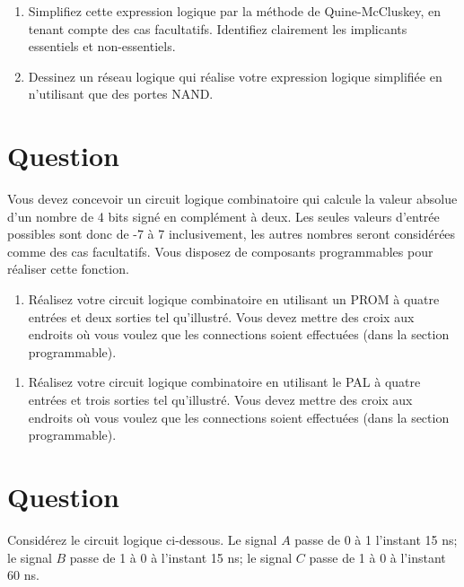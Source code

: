 \documentclass[letter, oneside]{book}
\begin{document}
\begin{enumerate}
\item Simplifiez cette expression logique par la méthode de
Quine-McCluskey, en tenant compte des cas facultatifs. Identifiez
clairement les implicants essentiels et non-essentiels.

\item Dessinez un réseau logique qui réalise votre expression logique
simplifiée en n'utilisant que des portes NAND.
\end{enumerate}

\section*{Question}
\label{sec:orgff5f2a7}
Vous devez concevoir un circuit logique combinatoire qui calcule la
valeur absolue d'un nombre de 4 bits signé en complément à deux. Les
seules valeurs d'entrée possibles sont donc de -7 à 7 inclusivement,
les autres nombres seront considérées comme des cas facultatifs. Vous
disposez de composants programmables pour réaliser cette fonction.

\begin{enumerate}
\item Réalisez votre circuit logique combinatoire en utilisant un PROM à
quatre entrées et deux sorties tel qu'illustré.
Vous devez mettre des croix aux endroits où vous voulez que les
connections soient effectuées (dans la section programmable).
\end{enumerate}
\begin{center}

\end{center}

\begin{enumerate}
\item Réalisez votre circuit logique combinatoire en utilisant le PAL à
quatre entrées et trois sorties tel qu'illustré.
Vous devez mettre des croix aux endroits où vous voulez que les
connections soient effectuées (dans la section programmable).
\end{enumerate}
\begin{center}

\end{center}

\section*{Question}
\label{sec:org9378cc1}
Considérez le circuit logique ci-dessous. Le signal \(A\) passe de 0 à 1
l'instant 15 ns; le signal \(B\) passe de 1 à 0 à l'instant 15 ns; le
signal \(C\) passe de 1 à 0 à l'instant 60 ns.
\begin{center}

\end{center}
\end{document}
